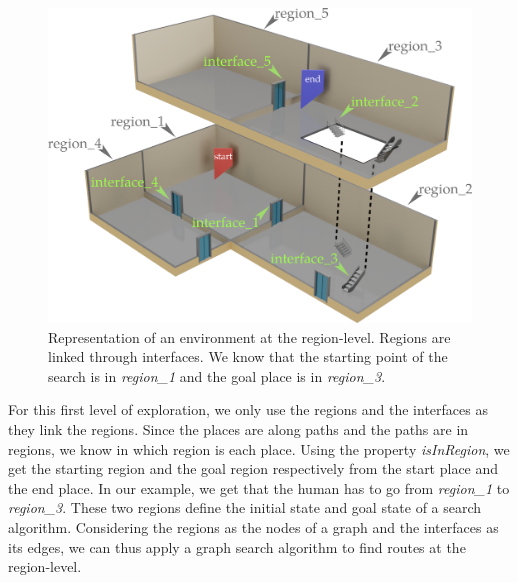 \begin{figure}[ht!]
\centering
\includegraphics[scale=0.22]{figures/chapter3/building_regions.png}
\caption{\label{fig:chap3_regions} Representation of an environment at the region-level. Regions are linked through interfaces. We know that the starting point of the search is in \textit{region\_1} and the goal place is in \textit{region\_3}. }
\end{figure}

For this first level of exploration, we only use the regions and the interfaces as they link the regions. Since the places are along paths and the paths are in regions, we know in which region is each place. Using the property \textit{isInRegion}, we get the starting region and the goal region respectively from the start place and the end place. In our example, we get that the human has to go from \textit{region\_1} to \textit{region\_3}. These two regions define the initial state and goal state of a search algorithm. Considering the regions as the nodes of a graph and the interfaces as its edges, we can thus apply a graph search algorithm to find routes at the region-level.

